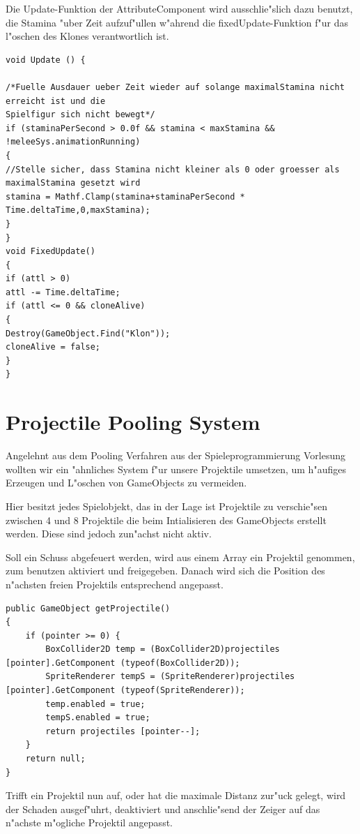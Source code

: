 Die Update-Funktion der AttributeComponent wird ausschlie"slich dazu benutzt, die Stamina "uber Zeit aufzuf"ullen w"ahrend die fixedUpdate-Funktion f"ur das l"oschen des Klones verantwortlich ist.
\begin{lstlisting}[breaklines=true]
void Update () {

/*Fuelle Ausdauer ueber Zeit wieder auf solange maximalStamina nicht erreicht ist und die
Spielfigur sich nicht bewegt*/
if (staminaPerSecond > 0.0f && stamina < maxStamina && !meleeSys.animationRunning)
{
//Stelle sicher, dass Stamina nicht kleiner als 0 oder groesser als maximalStamina gesetzt wird
stamina = Mathf.Clamp(stamina+staminaPerSecond * Time.deltaTime,0,maxStamina);
}   
}
void FixedUpdate()
{
if (attl > 0)
attl -= Time.deltaTime;
if (attl <= 0 && cloneAlive)
{
Destroy(GameObject.Find("Klon"));
cloneAlive = false; 
}
}
\end{lstlisting}

\section{Projectile Pooling System}
Angelehnt aus dem Pooling Verfahren aus der Spieleprogrammierung Vorlesung wollten wir ein "ahnliches System f"ur unsere Projektile umsetzen, um h"aufiges Erzeugen und L"oschen von GameObjects zu vermeiden.

Hier besitzt jedes Spielobjekt, das in der Lage ist Projektile zu verschie"sen zwischen 4 und 8 Projektile die beim Intialisieren des GameObjects erstellt werden. Diese sind jedoch zun"achst nicht aktiv.

Soll ein Schuss abgefeuert werden, wird aus einem Array ein Projektil genommen, zum benutzen aktiviert und freigegeben. Danach wird sich die Position des n"achsten freien Projektils entsprechend angepasst.

\begin{lstlisting}[breaklines=true]
public GameObject getProjectile()
{
	if (pointer >= 0) {
		BoxCollider2D temp = (BoxCollider2D)projectiles [pointer].GetComponent (typeof(BoxCollider2D));
		SpriteRenderer tempS = (SpriteRenderer)projectiles [pointer].GetComponent (typeof(SpriteRenderer));
		temp.enabled = true;
		tempS.enabled = true;
		return projectiles [pointer--];
	}
	return null;
}
\end{lstlisting}

Trifft ein Projektil nun auf, oder hat die maximale Distanz zur"uck gelegt, wird der Schaden ausgef"uhrt, deaktiviert und anschlie"send der Zeiger auf das n"achste m"ogliche Projektil  angepasst.

